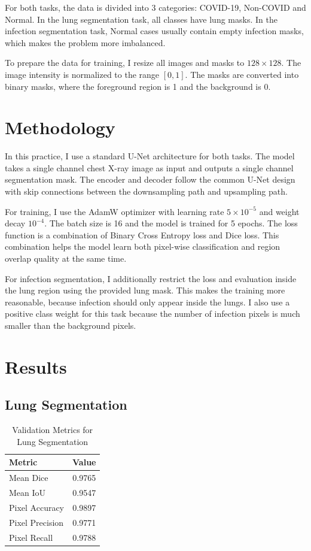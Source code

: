 \documentclass[conference]{IEEEtran}
\begin{document}
For both tasks, the data is divided into 3 categories: COVID-19, Non-COVID and Normal. In the lung segmentation task, all classes have lung masks. In the infection segmentation task, Normal cases usually contain empty infection masks, which makes the problem more imbalanced.

To prepare the data for training, I resize all images and masks to $128 \times 128$. The image intensity is normalized to the range $[0,1]$. The masks are converted into binary masks, where the foreground region is 1 and the background is 0.

\section{Methodology}

In this practice, I use a standard U-Net architecture for both tasks. The model takes a single channel chest X-ray image as input and outputs a single channel segmentation mask. The encoder and decoder follow the common U-Net design with skip connections between the downsampling path and upsampling path.

For training, I use the AdamW optimizer with learning rate $5 \times 10^{-5}$ and weight decay $10^{-4}$. The batch size is 16 and the model is trained for 5 epochs. The loss function is a combination of Binary Cross Entropy loss and Dice loss. This combination helps the model learn both pixel-wise classification and region overlap quality at the same time.

For infection segmentation, I additionally restrict the loss and evaluation inside the lung region using the provided lung mask. This makes the training more reasonable, because infection should only appear inside the lungs. I also use a positive class weight for this task because the number of infection pixels is much smaller than the background pixels.

\section{Results}

\subsection{Lung Segmentation}

\begin{table}[h]
    \centering
    \caption{Validation Metrics for Lung Segmentation}
    \label{tab:lung_metrics}
    \begin{tabular}{lc}
    \hline
    \textbf{Metric} & \textbf{Value} \\
    \hline
    Mean Dice & 0.9765 \\
    Mean IoU & 0.9547 \\
    Pixel Accuracy & 0.9897 \\
    Pixel Precision & 0.9771 \\
    Pixel Recall & 0.9788 \\
    \hline
    \end{tabular}
\end{table}
\end{document}
